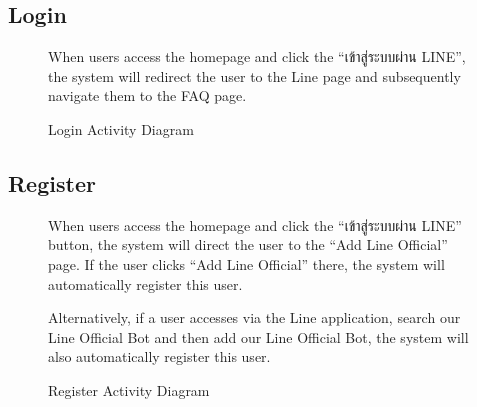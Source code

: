 \documentclass[12pt,oneside,openright,a4paper]{cpe-english-project}
\begin{document}
      \subsection{Login}
      \begin{figure}[!h]
        \centering
        \caption{Login Activity Diagram}\label{fig:AD_Login}
        \begin{justify}
          \qquad When users access the homepage and click the “\textthai{เข้าสู่ระบบผ่าน} LINE”, the system will redirect the user to the Line page and subsequently navigate them to the FAQ page. \par
        \end{justify}
      \end{figure}
\newpage
      \subsection{Register}
      \begin{figure}[!h]
        \centering
        \caption{Register Activity Diagram}\label{fig:AD_Register}
        \begin{justify}
          \qquad When users access the homepage and click the “\textthai{เข้าสู่ระบบผ่าน} LINE” button, the system will direct the user to the “Add Line Official” page. If the user clicks “Add Line Official” there, the system will automatically register this user.  \par
          \qquad Alternatively, if a user accesses via the Line application, search our Line Official Bot and then add our Line Official Bot, the system will also automatically register this user.  \par
        \end{justify}
      \end{figure}
\end{document}
